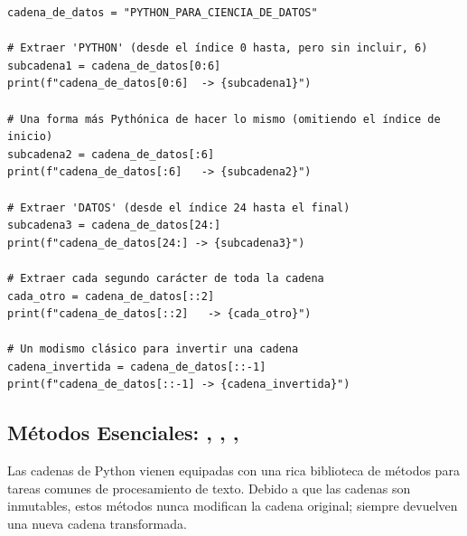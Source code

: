 \begin{example}\text{ }
\text{ }\begin{verbatim}
cadena_de_datos = "PYTHON_PARA_CIENCIA_DE_DATOS"

# Extraer 'PYTHON' (desde el índice 0 hasta, pero sin incluir, 6)
subcadena1 = cadena_de_datos[0:6]
print(f"cadena_de_datos[0:6]  -> {subcadena1}")

# Una forma más Pythónica de hacer lo mismo (omitiendo el índice de inicio)
subcadena2 = cadena_de_datos[:6]
print(f"cadena_de_datos[:6]   -> {subcadena2}")

# Extraer 'DATOS' (desde el índice 24 hasta el final)
subcadena3 = cadena_de_datos[24:]
print(f"cadena_de_datos[24:] -> {subcadena3}")

# Extraer cada segundo carácter de toda la cadena
cada_otro = cadena_de_datos[::2]
print(f"cadena_de_datos[::2]   -> {cada_otro}")

# Un modismo clásico para invertir una cadena
cadena_invertida = cadena_de_datos[::-1]
print(f"cadena_de_datos[::-1] -> {cadena_invertida}")
\end{verbatim}
\end{example}

\subsection{Métodos Esenciales: , , , }
\label{subsec:string_methods}
Las cadenas de Python vienen equipadas con una rica biblioteca de métodos para tareas comunes de procesamiento de texto. Debido a que las cadenas son inmutables, estos métodos nunca modifican la cadena original; siempre devuelven una nueva cadena transformada.


